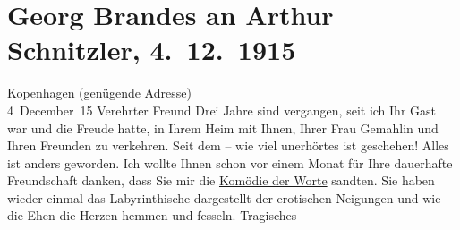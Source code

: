 

         
         \newcommand{\erwaehntePersonen}{Personen: Johann Wolfgang von Goethe, Peter Nansen, Olga Schnitzler}
         \newcommand{\erwaehnteOrte}{Orte: Dänemark, Kopenhagen, Wien}
         \newcommand{\erwaehnteWerke}{Werke: Die Brüder Menthe, Komödie der Worte. Drei Einakter, Macbeth, Professor Bernhardi. Komödie in fünf Akten, Wolfgang Goethe}
               \section[Georg Brandes an Arthur Schnitzler, 4. 12. 1915]{ Georg Brandes an Arthur Schnitzler, 4. 12. 1915}\nopagebreak{}\rehead{ }\begin{ledgroupsized}[t]{13cm}\normalsize\beginnumbering \toendnotes[C]{\smallbreak\pagebreak[2]} 
\toendnotes[C]{\smallbreak}\pstart
           \raggedleft{}{\pb}Kopenhagen (genügende Adresse){\\}4 December 15\pend
           \pstart{}Verehrter Freund\pend\pstart
           Drei Jahre sind vergangen, seit ich Ihr Gast war und die Freude hatte, in Ihrem
                    Heim mit Ihnen, Ihrer Frau Gemahlin und Ihren Freunden zu verkehren. Seit dem – wie viel
                    unerhörtes ist geschehen! Alles ist anders geworden.\pend
           \pstart
           Ich wollte Ihnen schon vor einem Monat für Ihre dauerhafte Freundschaft danken,
                    dass Sie mir die \uline{Komödie der Worte}
               sandten. Sie haben wieder einmal das Labyrinthische dargestellt der
                    erotischen Neigungen und wie die Ehen die Herzen hemmen und fesseln. Tragisches

\end{ledgroupsized}

